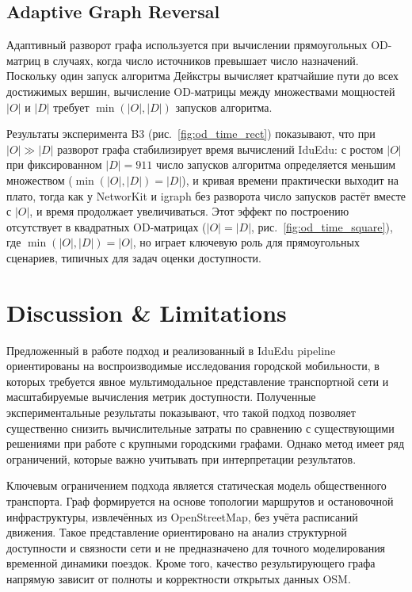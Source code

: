 \documentclass[sigconf,nonacm]{acmart}
\begin{document}
    \subsection{Adaptive Graph Reversal}
    \label{subsec:adaptive-graph-reversal}

    Адаптивный разворот графа используется при вычислении прямоугольных OD-матриц в случаях, когда число источников превышает число назначений.
    Поскольку один запуск алгоритма Дейкстры вычисляет кратчайшие пути до всех достижимых вершин, вычисление OD-матрицы
    между множествами мощностей $|O|$ и $|D|$ требует $\min(|O|,|D|)$ запусков алгоритма.

    Результаты эксперимента B3 (рис.~\ref{fig:od_time_rect}) показывают, что при $|O| \gg |D|$ разворот графа
    стабилизирует время вычислений IduEdu: с ростом $|O|$ при фиксированном $|D|=911$ число запусков алгоритма
    определяется меньшим множеством ($\min(|O|,|D|)=|D|$), и кривая времени практически выходит на плато,
    тогда как у NetworKit и igraph без разворота число запусков растёт вместе с $|O|$, и время продолжает увеличиваться.
    Этот эффект по построению отсутствует в квадратных OD-матрицах ($|O|=|D|$, рис.~\ref{fig:od_time_square}),
    где $\min(|O|,|D|)=|O|$, но играет ключевую роль для прямоугольных сценариев, типичных для задач оценки доступности.


    \section{Discussion \& Limitations}
    \label{sec:discussion-&-limitations}

    Предложенный в работе подход и реализованный в IduEdu pipeline ориентированы на воспроизводимые исследования городской мобильности,
    в которых требуется явное мультимодальное представление транспортной сети и масштабируемые вычисления метрик доступности.
    Полученные экспериментальные результаты показывают, что такой подход позволяет существенно снизить вычислительные
    затраты по сравнению с существующими решениями при работе с крупными городскими графами.
    Однако метод имеет ряд ограничений, которые важно учитывать при интерпретации результатов.

    Ключевым ограничением подхода является статическая модель общественного транспорта.
    Граф формируется на основе топологии маршрутов и остановочной инфраструктуры, извлечённых из OpenStreetMap, без учёта расписаний движения.
    Такое представление ориентировано на анализ структурной доступности и связности сети и не предназначено для точного моделирования временной динамики поездок.
    Кроме того, качество результирующего графа напрямую зависит от полноты и корректности открытых данных OSM\@.
\end{document}
